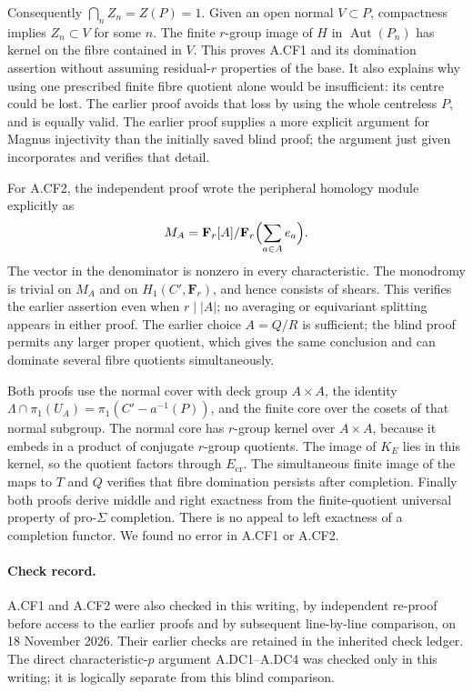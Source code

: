 Consequently $\bigcap_nZ_n=Z(P)=1$. Given an open normal $V\subset P$,
compactness implies $Z_n\subset V$ for some $n$. The finite
$r$-group image of $H$ in $\operatorname{Aut}(P_n)$ has kernel on
the fibre contained in $V$. This proves A.CF1 and its domination
assertion without assuming residual-$r$ properties of the base.
It also explains why using one prescribed finite fibre quotient
alone would be insufficient: its centre could be lost. The earlier
proof avoids that loss by using the whole centreless $P$, and is
equally valid. The earlier proof supplies a more explicit argument
for Magnus injectivity than the initially saved blind proof; the
argument just given incorporates and verifies that detail.

For A.CF2, the independent proof wrote the peripheral homology module
explicitly as
\[
 M_A=\mathbf F_r[A]/\mathbf F_r\Bigl(\sum_{a\in A}e_a\Bigr).
\]
The vector in the denominator is nonzero in every characteristic.
The monodromy is trivial on $M_A$ and on $H_1(C',\mathbf F_r)$,
and hence consists of shears. This verifies the earlier assertion
even when $r\mid|A|$; no averaging or equivariant splitting appears
in either proof. The earlier choice $A=Q/R$ is sufficient; the blind
proof permits any larger proper quotient, which gives the same
conclusion and can dominate several fibre quotients simultaneously.

Both proofs use the normal cover with deck group $A\times A$, the
identity $\Lambda\cap\pi_1(U_A)=\pi_1(C'-a^{-1}(P))$, and the finite
core over the cosets of that normal subgroup. The normal core has
$r$-group kernel over $A\times A$, because it embeds in a product of
conjugate $r$-group quotients. The image of $K_E$ lies in this kernel,
so the quotient factors through $E_{\mathrm{cr}}$. The simultaneous
finite image of the maps to $T$ and $Q$ verifies that fibre domination
persists after completion. Finally both proofs derive middle and
right exactness from the finite-quotient universal property of
pro-$\Sigma$ completion. There is no appeal to left exactness of a
completion functor. We found no error in A.CF1 or A.CF2.

\paragraph{Check record.}
A.CF1 and A.CF2 were also checked in this writing, by independent
re-proof before access to the earlier proofs and by subsequent
line-by-line comparison, on 18 November 2026. Their earlier checks
are retained in the inherited check ledger. The direct
characteristic-$p$ argument A.DC1--A.DC4 was checked only in this
writing; it is logically separate from this blind comparison.

